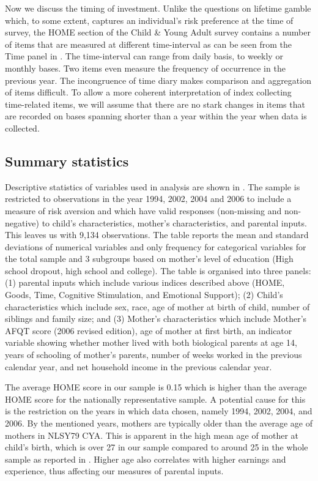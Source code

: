 \documentclass[]{article}
\begin{document}
Now we discuss the timing of investment. Unlike the questions on lifetime gamble which, to some extent, captures an individual's risk preference at the time of survey, the HOME section of the Child \& Young Adult survey contains a number of items that are measured at different time-interval as can be seen from the Time panel in . The time-interval can range from daily basis, to weekly or monthly bases. Two items even measure the frequency of occurrence in the previous year. The incongruence of time diary makes comparison and aggregation of items difficult. To allow a more coherent interpretation of index collecting time-related items, we will assume that there are no stark changes in items that are recorded on bases spanning shorter than a year within the year when data is collected.


\subsection{Summary statistics}



Descriptive statistics of variables used in analysis are shown in . The sample is restricted to observations in the year 1994, 2002, 2004 and 2006 to include a measure of risk aversion and which have valid responses (non-missing and non-negative) to child's characteristics, mother's characteristics, and parental inputs. This leaves us with 9,134 observations. The table reports the mean and standard deviations of numerical variables and only frequency for categorical variables for the total sample and 3 subgroups based on mother's level of education (High school dropout, high school and college). The table is organised into three panels: (1) parental inputs which include various indices described above (HOME, Goods, Time, Cognitive Stimulation, and Emotional Support); (2) Child's characteristics which include sex, race, age of mother at birth of child, number of siblings and family size; and (3) Mother's characteristics which include Mother's AFQT score (2006 revised edition), age of mother at first birth, an indicator variable showing whether mother lived with both biological parents at age 14, years of schooling of mother's parents, number of weeks worked in the previous calendar year, and net household income in the previous calendar year.



The average HOME score in our sample is 0.15 which is higher than the average HOME score for the nationally representative sample. A potential cause for this is the restriction on the years in which data chosen, namely 1994, 2002, 2004, and 2006. By the mentioned years, mothers are typically older than the average age of mothers in NLSY79 CYA. This is apparent in the high mean age of mother at child's birth, which is over 27 in our sample compared to around 25 in the whole sample as reported in \citet{carneiro2016partial}. Higher age also correlates with higher earnings and experience, thus affecting our measures of parental inputs. 
\end{document}
